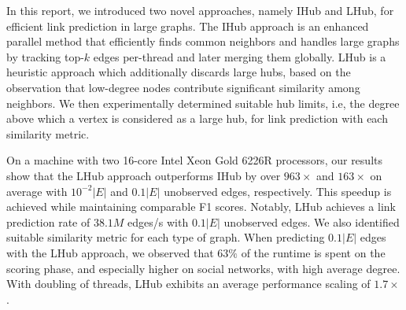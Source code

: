 In this report, we introduced two novel approaches, namely IHub and LHub, for efficient link prediction in large graphs. The IHub approach is an enhanced parallel method that efficiently finds common neighbors and handles large graphs by tracking top-$k$ edges per-thread and later merging them globally. LHub is a heuristic approach which additionally discards large hubs, based on the observation that low-degree nodes contribute significant similarity among neighbors. We then experimentally determined suitable hub limits, i.e, the degree above which a vertex is considered as a large hub, for link prediction with each similarity metric.

On a machine with two 16-core Intel Xeon Gold 6226R processors, our results show that the LHub approach outperforms IHub by over $963\times$ and $163\times$ on average with $10^{-2}|E|$ and $0.1|E|$ unobserved edges, respectively. This speedup is achieved while maintaining comparable F1 scores. Notably, LHub achieves a link prediction rate of $38.1M$ edges/s with $0.1|E|$ unobserved edges. We also identified suitable similarity metric for each type of graph. When predicting $0.1|E|$ edges with the LHub approach, we observed that $63\%$ of the runtime is spent on the scoring phase, and especially higher on social networks, with high average degree. With doubling of threads, LHub exhibits an average performance scaling of $1.7\times$.







